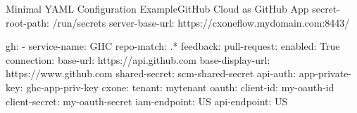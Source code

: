 \begin{code}{Minimal YAML Configuration Example}{GitHub Cloud as GitHub App}{}
secret-root-path: /run/secrets
server-base-url: https://cxoneflow.mydomain.com:8443/

gh:
    - service-name: GHC
      repo-match: .*
      feedback:
        pull-request:
          enabled: True
      connection:
        base-url: https://api.github.com
        base-display-url: https://www.github.com
        shared-secret: scm-shared-secret
        api-auth:
          app-private-key: ghc-app-priv-key
      cxone:
        tenant: mytenant
        oauth:
          client-id: my-oauth-id
          client-secret: my-oauth-secret
        iam-endpoint: US
        api-endpoint: US
\end{code}
  
